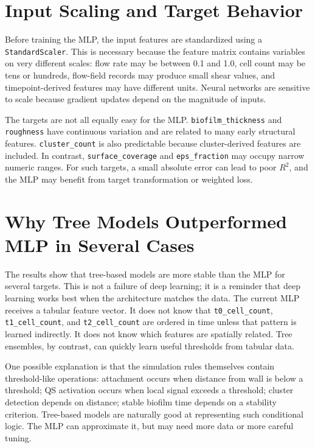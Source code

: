 \documentclass[12pt,a4paper,oneside]{report}
\begin{document}
\section{Input Scaling and Target Behavior}
Before training the MLP, the input features are standardized using a \texttt{StandardScaler}. This is necessary because the feature matrix contains variables on very different scales: flow rate may be between 0.1 and 1.0, cell count may be tens or hundreds, flow-field records may produce small shear values, and timepoint-derived features may have different units. Neural networks are sensitive to scale because gradient updates depend on the magnitude of inputs.

The targets are not all equally easy for the MLP. \texttt{biofilm\_thickness} and \texttt{roughness} have continuous variation and are related to many early structural features. \texttt{cluster\_count} is also predictable because cluster-derived features are included. In contrast, \texttt{surface\_coverage} and \texttt{eps\_fraction} may occupy narrow numeric ranges. For such targets, a small absolute error can lead to poor \(R^2\), and the MLP may benefit from target transformation or weighted loss.

\section{Why Tree Models Outperformed MLP in Several Cases}
The results show that tree-based models are more stable than the MLP for several targets. This is not a failure of deep learning; it is a reminder that deep learning works best when the architecture matches the data. The current MLP receives a tabular feature vector. It does not know that \texttt{t0\_cell\_count}, \texttt{t1\_cell\_count}, and \texttt{t2\_cell\_count} are ordered in time unless that pattern is learned indirectly. It does not know which features are spatially related. Tree ensembles, by contrast, can quickly learn useful thresholds from tabular data.

One possible explanation is that the simulation rules themselves contain threshold-like operations: attachment occurs when distance from wall is below a threshold; QS activation occurs when local signal exceeds a threshold; cluster detection depends on distance; stable biofilm time depends on a stability criterion. Tree-based models are naturally good at representing such conditional logic. The MLP can approximate it, but may need more data or more careful tuning.
\end{document}
